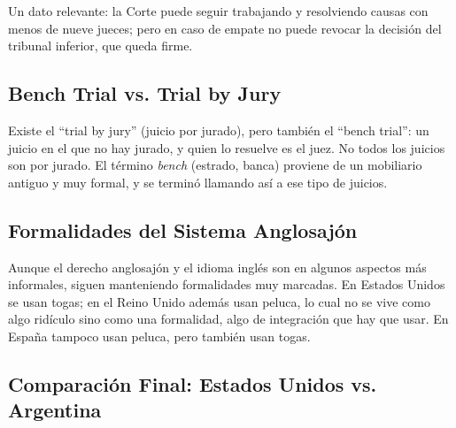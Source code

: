 \documentclass[12pt,oneside]{book}
\begin{document}
\begin{important}
Un dato relevante: la Corte puede seguir trabajando y resolviendo causas con menos de nueve jueces; pero en caso de empate no puede revocar la decisión del tribunal inferior, que queda firme.
\end{important}

\subsection{Bench Trial vs. Trial by Jury}

Existe el ``trial by jury'' (juicio por jurado), pero también el ``bench trial'': un juicio en el que no hay jurado, y quien lo resuelve es el juez. No todos los juicios son por jurado. El término \textit{bench} (estrado, banca) proviene de un mobiliario antiguo y muy formal, y se terminó llamando así a ese tipo de juicios.

\subsection{Formalidades del Sistema Anglosajón}

Aunque el derecho anglosajón y el idioma inglés son en algunos aspectos más informales, siguen manteniendo formalidades muy marcadas. En Estados Unidos se usan togas; en el Reino Unido además usan peluca, lo cual no se vive como algo ridículo sino como una formalidad, algo de integración que hay que usar. En España tampoco usan peluca, pero también usan togas.

\subsection{Comparación Final: Estados Unidos vs. Argentina}
\end{document}
